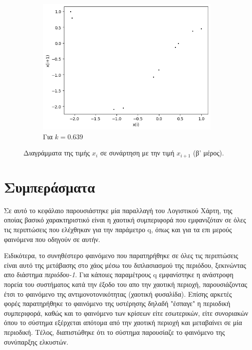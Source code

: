 \begin{figure}[ht]
\begin{subfigure}[b]{0.4\textwidth}
		\includegraphics[width=\textwidth]{LateX images/graphs q21/g13}
		\caption{Για $k=0.639$}
		\label{f:k113}
	\end{subfigure}
	\hfill
	\caption{Διαγράμματα της τιμής \(x_i\) σε συνάρτηση με την τιμή \(x_{i+1}\) (β' μέρος).}
	\label{f:k245}
\end{figure}

\clearpage


\section{Συμπεράσματα}

Σε αυτό το κεφάλαιο παρουσιάστηκε μία παραλλαγή του Λογιστικού Χάρτη, της οποίας βασικό χαρακτηριστικό είναι η χαοτική συμπεριφορά που εμφανιζόταν σε όλες τις περιπτώσεις που ελέχθηκαν για την παράμετρο q, όπως και για τα επι μερούς φαινόμενα που οδηγούν σε αυτήν.

Ειδικότερα, το συνηθέστερο φαινόμενο που παρατηρήθηκε σε όλες τις περιπτώσεις είναι αυτό της μετάβασης στο χάος μέσω του διπλασιασμού της περιόδου, ξεκινώντας απο διάστημα \emph{περιόδου-1}.
Για κάποιες παραμέτρους q εμφανίστηκε η ανάστροφη πορεία του συστήματος κατά την έξοδο του απο την χαοτική περιοχή, παρουσιάζοντας έτσι το φαινόμενο της αντιμονοτονικότητας (χαοτική φυσαλίδα).
Επίσης αρκετές φορές παρατηρήθηκε το φαινόμενο της υστέρησης δηλαδή "έσπαγε" η περιοδική συμπεριφορά, καθώς και το φαινόμενο των κρίσεων είτε εσωτερικών, είτε συνοριακών όπου το σύστημα εξέρχεται απότομα από την χαοτική περιοχή και μεταβαίνει σε μία περιοδική. Τέλος, διαπιστώθηκε ότι το σύστημα παρουσίαζε το φαινόμενο της συνύπαρξης ελκυστών. 

\newpage
